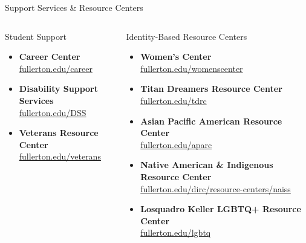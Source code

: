 \documentclass[10pt]{beamer}
\begin{document}
\begin{frame}{Support Services \& Resource Centers}
\begin{columns}[T,onlytextwidth]
  \begin{block}{Student Support}
    \begin{itemize}\setlength{\itemsep}{4pt}
      \item \textbf{Career Center}\\[-2pt]
        \footnotesize\href{https://www.fullerton.edu/career}{fullerton.edu/career}
      \item \textbf{Disability Support Services}\\[-2pt]
        \footnotesize\href{https://www.fullerton.edu/DSS}{fullerton.edu/DSS}
      \item \textbf{Veterans Resource Center}\\[-2pt]
        \footnotesize\href{https://www.fullerton.edu/veterans}{fullerton.edu/veterans}
    \end{itemize}
  \end{block}

  \begin{block}{Identity-Based Resource Centers}
    \begin{itemize}\setlength{\itemsep}{4pt}
      \item \textbf{Women's Center}\\[-2pt]
        \footnotesize\href{https://www.fullerton.edu/womenscenter}{fullerton.edu/womenscenter}
      \item \textbf{Titan Dreamers Resource Center}\\[-2pt]
        \footnotesize\href{https://www.fullerton.edu/tdrc}{fullerton.edu/tdrc}
      \item \textbf{Asian Pacific American Resource Center}\\[-2pt]
        \footnotesize\href{https://www.fullerton.edu/aparc}{fullerton.edu/aparc}
      \item \textbf{Native American \& Indigenous Resource Center}\\[-2pt]
        \footnotesize\href{https://www.fullerton.edu/dirc/resource-centers/naiss.php}{fullerton.edu/dirc/resource-centers/naiss}
      \item \textbf{Losquadro Keller LGBTQ+ Resource Center}\\[-2pt]
        \footnotesize\href{https://www.fullerton.edu/lgbtq}{fullerton.edu/lgbtq}
    \end{itemize}
  \end{block}
\end{columns}
\end{frame}
\end{document}
